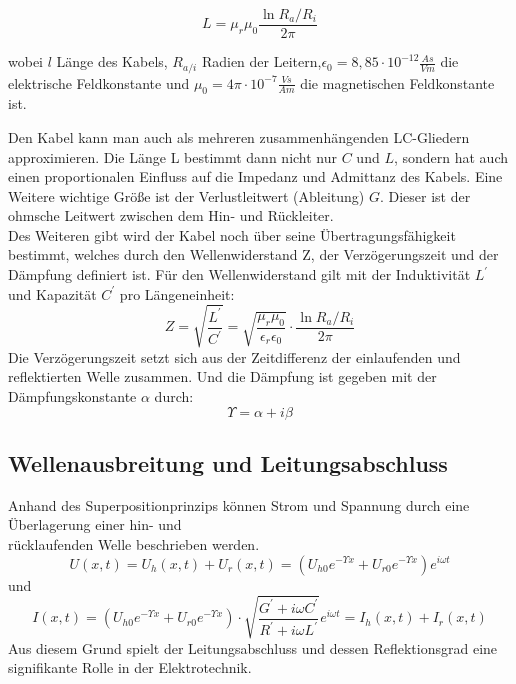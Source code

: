 \documentclass{article}
\begin{document}
    \begin{equation}
        L= \mu_r \mu_0  \frac{\ln{R_a/R_i}}{2\pi}
    \end{equation}
    
wobei $l$ Länge des Kabels, $R_{a/i}$ Radien der Leitern,$\epsilon_0 = 8,85\cdot10^{-12} \frac{As}{Vm}$ die elektrische Feldkonstante und $\mu_0 = 4\pi\cdot 10^{-7} \frac{Vs}{Am}$ die magnetischen Feldkonstante ist.


Den Kabel kann man auch als mehreren zusammenhängenden LC-Gliedern approximieren. Die Länge L bestimmt dann nicht nur  $C$ und $L$, sondern hat auch einen proportionalen Einfluss auf die Impedanz und Admittanz des Kabels. Eine Weitere wichtige Größe ist der Verlustleitwert (Ableitung) $G$. Dieser ist der ohmsche Leitwert zwischen dem Hin- und Rückleiter. \\
Des Weiteren gibt wird der Kabel noch über seine Übertragungsfähigkeit bestimmt, welches durch den Wellenwiderstand Z, der Verzögerungszeit und der Dämpfung definiert ist. Für den Wellenwiderstand gilt mit der Induktivität $L^{\prime}$ und Kapazität $C^{\prime}$ pro Längeneinheit:
\[ Z = \sqrt{\frac{L^{\prime}}{C^{\prime}}}= \sqrt{\frac{\mu_r \mu_0}{\epsilon_r \epsilon_0}}\cdot \frac{\ln{R_a/R_i}}{2\pi}\]
Die Verzögerungszeit setzt sich aus der Zeitdifferenz der einlaufenden und reflektierten Welle zusammen. 
Und die Dämpfung ist gegeben mit der Dämpfungskonstante $ \alpha$ durch:
\begin{equation*}
    \Upsilon = \alpha + i \beta
\end{equation*}

\subsection*{Wellenausbreitung und Leitungsabschluss}
Anhand des Superpositionprinzips können Strom und Spannung durch eine Überlagerung einer hin- und \\ rücklaufenden Welle beschrieben werden.
\begin{equation*}
   U(x,t) = U_h(x,t) + U_r(x,t)= (U_{h0} e ^{-\Upsilon x} + U_{r0} e ^{-\Upsilon x}) e^{i \omega t} 
\end{equation*}
und 
\begin{equation*}
    I(x,t) = (U_{h0} e^{-\Upsilon x} + U_{r0} e^{-\Upsilon x}) \cdot \sqrt{\frac{G^{\prime}+ i \omega C^{\prime}}{R^{\prime}+ i \omega L^{\prime}}}e^{i \omega t}= I_h(x,t) + I_r(x,t)
\end{equation*}
Aus diesem Grund spielt der Leitungsabschluss und dessen Reflektionsgrad eine signifikante Rolle in der Elektrotechnik.
\end{document}
